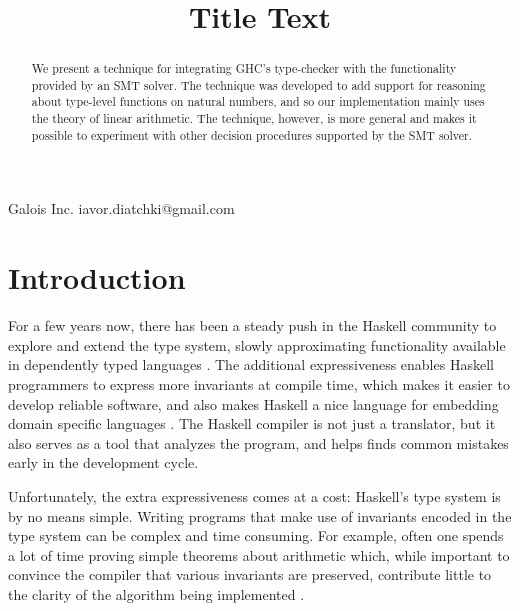 \documentclass{sigplanconf}
\begin{document}
\setlength{\pdfpageheight}{\paperheight}
\setlength{\pdfpagewidth}{\paperwidth}



\title{Title Text}

           {Galois Inc.}
           {iavor.diatchki@gmail.com}

\maketitle

\begin{abstract}
We present a technique for integrating GHC's type-checker with the
functionality provided by an SMT solver.  The technique was developed
to add support for reasoning about type-level functions on natural
numbers, and so our implementation mainly uses the theory of linear
arithmetic.  The technique, however, is more general and makes it
possible to experiment with other decision procedures supported by
the SMT solver.
\end{abstract}


\section{Introduction}

For a few years now, there has been a steady push in the Haskell
community to explore and extend the type system, slowly approximating
functionality available in dependently typed languages
\cite{Eisenberg2012,Lindley2013,Eisenberg2014}.  The additional
expressiveness enables Haskell programmers to express more
invariants at compile time, which makes it easier to develop
reliable software, and also makes Haskell a nice language
for embedding domain specific languages \cite{ivory-experience}.
The Haskell compiler is not just a translator, but it also
serves as a tool that analyzes the program, and helps
finds common mistakes early in the development cycle.

Unfortunately, the extra expressiveness comes at a cost:
Haskell's type system is by no means simple. Writing
programs that make use of invariants encoded in the
type system can be complex and time consuming.  For
example, often one spends a lot of time proving simple theorems
about arithmetic which, while important to convince the compiler
that various invariants are preserved, contribute little to
the clarity of the algorithm being implemented \cite{Lindley2013}.
\end{document}
